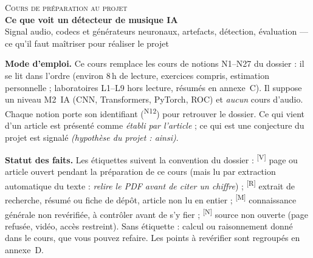 \documentclass[10pt,a4paper]{article}
\newcommand{\sV}{\textsuperscript{\scriptsize\textcolor{green!40!black}{[V]}}}
\newcommand{\sR}{\textsuperscript{\scriptsize\textcolor{orange!80!black}{[R]}}}
\newcommand{\sM}{\textsuperscript{\scriptsize\textcolor{red!70!black}{[M]}}}
\newcommand{\sN}{\textsuperscript{\scriptsize\textcolor{black!60}{[N]}}}
\newcommand{\hyp}[1]{\textit{(hypothèse du projet : #1)}}
\newcommand{\nref}[1]{\textsuperscript{\scriptsize\textcolor{black!55}{#1}}}
\begin{document}
\begin{center}
{\large\scshape Cours de préparation au projet}\\[0.3em]
{\LARGE\bfseries Ce que voit un détecteur de musique IA}\\[0.3em]
{\normalsize Signal audio, codecs et générateurs neuronaux, artefacts, détection, évaluation --- ce qu'il faut maîtriser pour réaliser le projet}
\end{center}

\begin{tcolorbox}[enhanced,colback=black!3!white,colframe=black!35,boxrule=0.4pt,arc=2pt,left=6pt,right=6pt,top=3pt,bottom=3pt,breakable]
\textbf{Mode d'emploi.} Ce cours remplace les cours de notions N1--N27 du dossier : il se lit dans l'ordre (environ 8\,h de lecture, exercices compris, estimation personnelle ; laboratoires L1--L9 hors lecture, résumés en annexe~C). Il suppose un niveau M2~IA (CNN, Transformers, PyTorch, ROC) et \emph{aucun} cours d'audio. Chaque notion porte son identifiant (\nref{N12}) pour retrouver le dossier. Ce qui vient d'un article est présenté comme \emph{établi par l'article} ; ce qui est une conjecture du projet est signalé \hyp{ainsi}.

\textbf{Statut des faits.} Les étiquettes suivent la convention du dossier :
\sV{} page ou article ouvert pendant la préparation de ce cours (mais lu par extraction automatique du texte : \emph{relire le PDF avant de citer un chiffre}) ;
\sR{} extrait de recherche, résumé ou fiche de dépôt, article non lu en entier ;
\sM{} connaissance générale non revérifiée, à contrôler avant de s'y fier ;
\sN{} source non ouverte (page refusée, vidéo, accès restreint).
Sans étiquette : calcul ou raisonnement donné dans le cours, que vous pouvez refaire. Les points à revérifier sont regroupés en annexe~D.
\end{tcolorbox}
\end{document}
